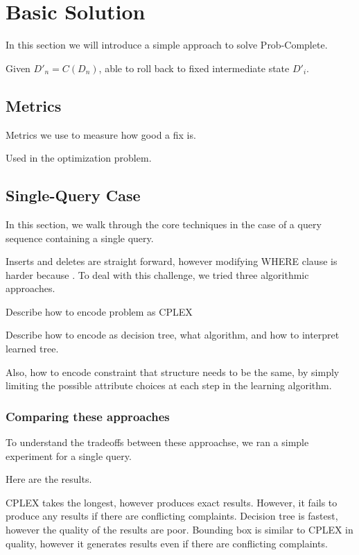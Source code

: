 \section{Basic Solution}

In this section we will introduce a simple approach to solve Prob-Complete.


Given $D'_n = C(D_n)$, able to roll back to fixed intermediate state $D'_i$.


\subsection{Metrics}

Metrics we use to measure how good a fix is.

Used in the optimization problem.




\subsection{Single-Query Case}

In this section, we walk through the core techniques in the case of a query sequence containing a single query.

Inserts and deletes are straight forward, however modifying WHERE clause is harder because
.  To deal with this challenge, we tried three algorithmic approaches.

Describe how to encode problem as CPLEX



Describe how to encode as decision tree, what algorithm, and how to interpret learned tree.

Also, how to encode constraint that structure needs to be the same, by simply limiting the possible attribute
choices at each step in the learning algorithm.

\subsubsection{Comparing these approaches}

To understand the tradeoffs between these approachse, we ran a simple experiment for a single query.

Here are the results.


CPLEX takes the longest, however produces exact results.  However, it fails to produce any results if there are conflicting complaints.
Decision tree is fastest, however the quality of the results are poor.
Bounding box is similar to CPLEX in quality, however it generates results even if there are conflicting complaints.








